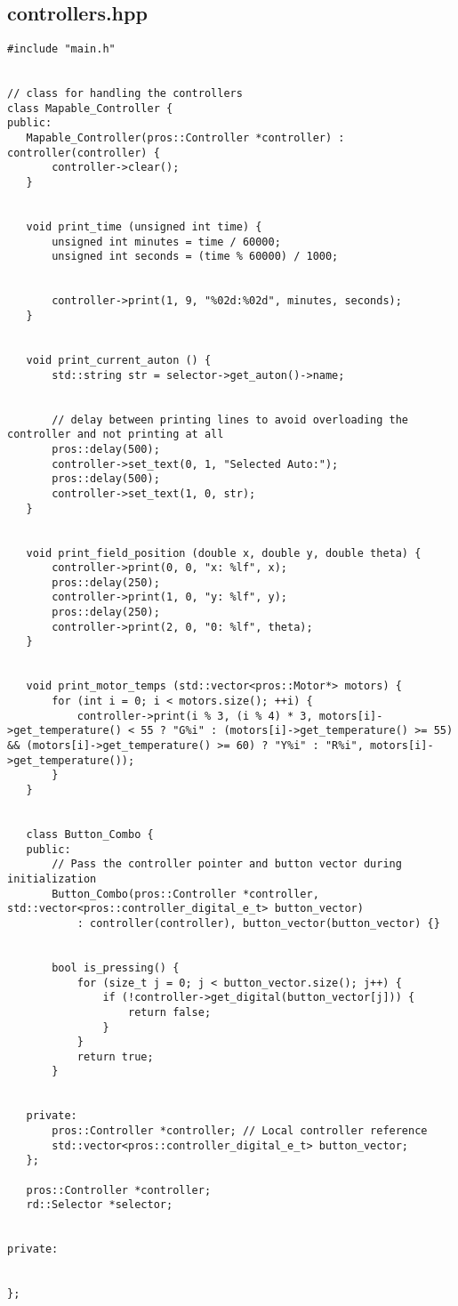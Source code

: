 \subsection*{controllers.hpp}
\begin{verbatim}
#include "main.h"


// class for handling the controllers
class Mapable_Controller {
public:
   Mapable_Controller(pros::Controller *controller) : controller(controller) {
       controller->clear();
   }


   void print_time (unsigned int time) {
       unsigned int minutes = time / 60000;
       unsigned int seconds = (time % 60000) / 1000;


       controller->print(1, 9, "%02d:%02d", minutes, seconds);
   }


   void print_current_auton () {
       std::string str = selector->get_auton()->name;


       // delay between printing lines to avoid overloading the controller and not printing at all
       pros::delay(500);
       controller->set_text(0, 1, "Selected Auto:");
       pros::delay(500);
       controller->set_text(1, 0, str);
   }


   void print_field_position (double x, double y, double theta) {
       controller->print(0, 0, "x: %lf", x);
       pros::delay(250);
       controller->print(1, 0, "y: %lf", y);
       pros::delay(250);
       controller->print(2, 0, "0: %lf", theta);
   }


   void print_motor_temps (std::vector<pros::Motor*> motors) {
       for (int i = 0; i < motors.size(); ++i) {
           controller->print(i % 3, (i % 4) * 3, motors[i]->get_temperature() < 55 ? "G%i" : (motors[i]->get_temperature() >= 55) && (motors[i]->get_temperature() >= 60) ? "Y%i" : "R%i", motors[i]->get_temperature());
       }
   }


   class Button_Combo {
   public:
       // Pass the controller pointer and button vector during initialization
       Button_Combo(pros::Controller *controller, std::vector<pros::controller_digital_e_t> button_vector)
           : controller(controller), button_vector(button_vector) {}


       bool is_pressing() {
           for (size_t j = 0; j < button_vector.size(); j++) {
               if (!controller->get_digital(button_vector[j])) {
                   return false;
               }
           }
           return true;
       }


   private:
       pros::Controller *controller; // Local controller reference
       std::vector<pros::controller_digital_e_t> button_vector;
   };
  
   pros::Controller *controller;
   rd::Selector *selector;


private:


};

\end{verbatim}

